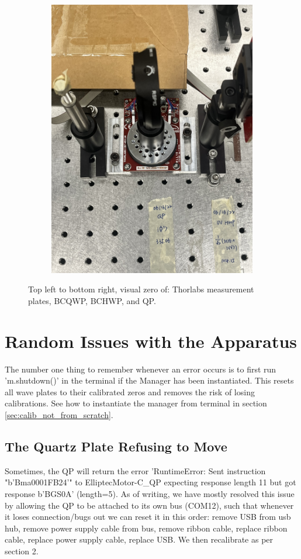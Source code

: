 \documentclass{paper}[11pt]
\begin{document}
\begin{figure}
\begin{subfigure}{0.45\linewidth}
        \includegraphics[width=1\linewidth, angle = -90]{figs/qp_zero}
        \caption{}
        \label{fig:qp_zero}
    \end{subfigure}
    \caption{Top left to bottom right, visual zero of: Thorlabs measurement plates, BCQWP, BCHWP, and QP. }
\end{figure}

\section{Random Issues with the Apparatus}
The number one thing to remember whenever an error occurs is to first run 'm.shutdown()' in the terminal if the Manager has been instantiated. This resets all wave plates to their calibrated zeros and removes the risk of losing calibrations. See how to instantiate the manager from terminal in section \ref{sec:calib_not_from_scratch}.

\subsection{The Quartz Plate Refusing to Move}
Sometimes, the QP will return the error 'RuntimeError: Sent instruction "b'Bma0001FB24'" to ElliptecMotor-C\_QP expecting response length 11 but got response b'BGS0A' (length=5). As of writing, we have mostly resolved this issue by allowing the QP to be attached to its own bus (COM12), such that whenever it loses connection/bugs out we can reset it in this order: remove USB from usb hub, remove power supply cable from bus, remove ribbon cable, replace ribbon cable, replace power supply cable, replace USB. We then recalibrate as per section 2.
\end{document}

